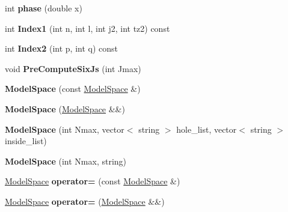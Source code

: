 \begin{DoxyCompactItemize}
\item 
\hypertarget{classModelSpace_a07d1c8f00131cc6c192d440e6be329f3}{int {\bfseries phase} (double x)}\label{classModelSpace_a07d1c8f00131cc6c192d440e6be329f3}

\item 
\hypertarget{classModelSpace_ab9e4a36b032abc3fcd81da8b2a8707d2}{int {\bfseries Index1} (int n, int l, int j2, int tz2) const }\label{classModelSpace_ab9e4a36b032abc3fcd81da8b2a8707d2}

\item 
\hypertarget{classModelSpace_acb31fdcb54a8fe3168378969176f0157}{int {\bfseries Index2} (int p, int q) const }\label{classModelSpace_acb31fdcb54a8fe3168378969176f0157}

\item 
\hypertarget{classModelSpace_a596efc87ee50717e2b7057ccfd9cb516}{void {\bfseries Pre\-Compute\-Six\-Js} (int Jmax)}\label{classModelSpace_a596efc87ee50717e2b7057ccfd9cb516}

\item 
\hypertarget{classModelSpace_a9554b9bc74b82e392fafc9de496fce5f}{{\bfseries Model\-Space} (const \hyperlink{classModelSpace}{Model\-Space} \&)}\label{classModelSpace_a9554b9bc74b82e392fafc9de496fce5f}

\item 
\hypertarget{classModelSpace_a6fe287e59b9aca7719a553f7dedcd2d7}{{\bfseries Model\-Space} (\hyperlink{classModelSpace}{Model\-Space} \&\&)}\label{classModelSpace_a6fe287e59b9aca7719a553f7dedcd2d7}

\item 
\hypertarget{classModelSpace_a1d93cd1705e0f5dd3421e7617dbbc16e}{{\bfseries Model\-Space} (int Nmax, vector$<$ string $>$ hole\-\_\-list, vector$<$ string $>$ inside\-\_\-list)}\label{classModelSpace_a1d93cd1705e0f5dd3421e7617dbbc16e}

\item 
\hypertarget{classModelSpace_a75259e2dbe635145cb2f3973866e941f}{{\bfseries Model\-Space} (int Nmax, string)}\label{classModelSpace_a75259e2dbe635145cb2f3973866e941f}

\item 
\hypertarget{classModelSpace_a2b01062b499979b919b7b77b04745cbe}{\hyperlink{classModelSpace}{Model\-Space} {\bfseries operator=} (const \hyperlink{classModelSpace}{Model\-Space} \&)}\label{classModelSpace_a2b01062b499979b919b7b77b04745cbe}

\item 
\hypertarget{classModelSpace_ab1d44cc22730d233506daa4f6e83187c}{\hyperlink{classModelSpace}{Model\-Space} {\bfseries operator=} (\hyperlink{classModelSpace}{Model\-Space} \&\&)}\label{classModelSpace_ab1d44cc22730d233506daa4f6e83187c}


\end{DoxyCompactItemize}
